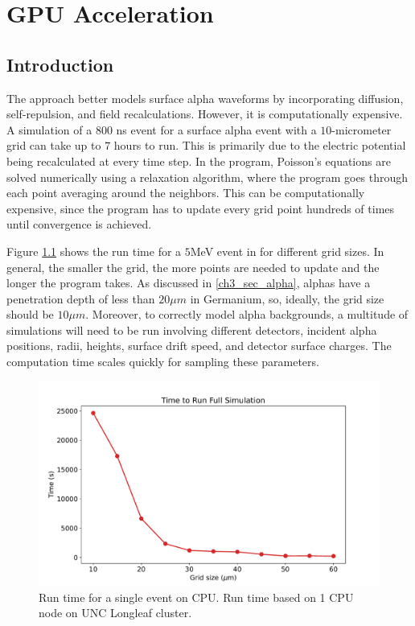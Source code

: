 \chapter{GPU Acceleration}
\label{chap4:gpu}

\section{Introduction}
The {\ehd} approach better models surface alpha waveforms by incorporating diffusion, self-repulsion, and field recalculations. However, it is computationally expensive. A simulation of a $800$ ns event for a surface alpha event with a $10$-micrometer grid can take up to $7$ hours to run. This is primarily due to the electric potential being recalculated at every time step. In the program, Poisson's equations are solved numerically using a relaxation algorithm, where the program goes through each point averaging around the neighbors. This can be computationally expensive, since the program has to update every grid point hundreds of times until convergence is achieved. 

Figure \ref{fig:CPU_time} shows the run time for a $5$MeV event in {\ehd} for different grid sizes. In general, the smaller the grid, the more points are needed to update and the longer the program takes. As discussed in \ref{ch3_sec_alpha}, alphas have a penetration depth of less than $20 \mu m$ in Germanium, so, ideally, the grid size should be $10 \mu m$. Moreover, to correctly model alpha backgrounds, a multitude of simulations will need to be run involving different detectors, incident alpha positions, radii, heights, surface drift speed, and detector surface charges. The computation time scales quickly for sampling these parameters.

\begin{figure}
\centering
 \includegraphics[width=0.99\linewidth]{ch4/figs/cpu_run_time.pdf}
\caption{Run time for a single {\ehd} event on CPU. Run time based on 1 CPU node on UNC Longleaf cluster.}
\label{fig:CPU_time}
\end{figure}

